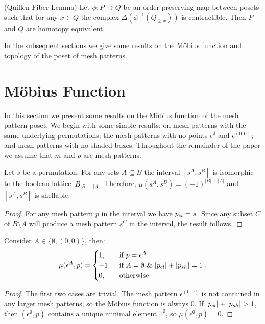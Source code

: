 \documentclass[11pt,a4paper,oneside]{article}
\begin{document}
\begin{prop}\label{thm:Quil}(Quillen Fiber Lemma)
Let $\phi:P\rightarrow Q$ be an order-preserving map between posets such that for any
$x\in Q$ the complex $\Delta(\phi^{-1}(Q_{\ge x}))$ is contractible.
Then $P$ and $Q$ are homotopy equivalent.
\end{prop}

In the subsequent sections we give some results on the M\"obius function and topology of
the poset of mesh patterns.

\section{M\"obius Function}\label{sec:MF}
In this section we present some results on the M\"obius function of the mesh pattern poset.
We begin with some simple results: on mesh patterns with the same underlying permutations;
the mesh patterns with no points $\epsilon^\emptyset$ and $\epsilon^{(0,0)}$;
and mesh patterns with no shaded boxes.
Throughout the remainder of the paper we assume that $m$ and $p$ are
mesh patterns.

\begin{lem}
Let $s$ be a permutation. For any sets $A\subseteq B$ the interval $[s^A,s^B]$ is isomorphic to the boolean
 lattice~$B_{|B|-|A|}$. Therefore, $\mu(s^A,s^B)=(-1)^{|B|-|A|}$ and
$[s^A,s^B]$ is shellable.
\begin{proof}
For any mesh pattern $p$ in the interval we have $p_{cl} = s$. Since
any subset $C$ of $B \setminus A$ will produce a mesh pattern $s^C$
in the interval, the result follows.
\end{proof}
\end{lem}

\begin{lem}
Consider $A\in\{\emptyset,(0,0)\}$, then:
$$\mu(\epsilon^{A},p)=\begin{cases}
1,&\mbox{ if }p=\epsilon^A \\
-1,&\mbox{ if }A=\emptyset\,\,\&\,\,|p_{cl}|+|p_{sh}|=1\\
0,&\mbox{ otherwise}
\end{cases}.$$
\begin{proof}
The first two cases are trivial. The
mesh pattern $\epsilon^{(0,0)}$ is not contained in any larger mesh patterns, so
the M\"obius function is always $0$. If $|\cl{p}|+|\sh{p}|>1$, then
$(\epsilon^\emptyset,p)$ contains a unique minimal element $1^\emptyset$, so
$\mu(\epsilon^\emptyset,p)=0$.
\end{proof}
\end{lem}
\end{document}
